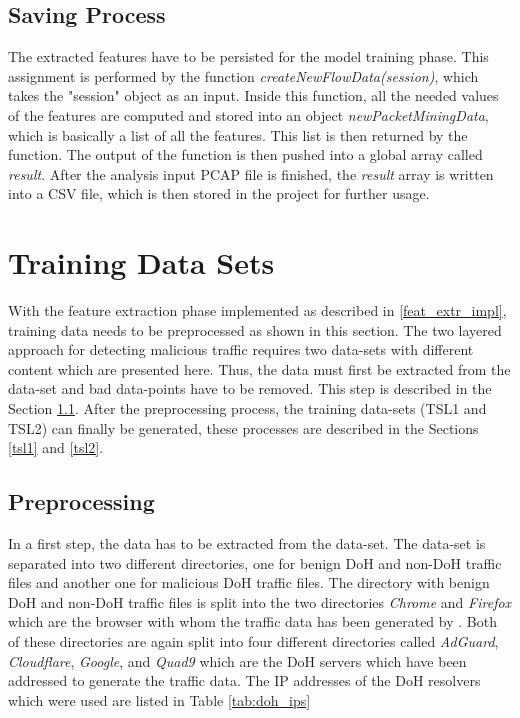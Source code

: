 \subsection{Saving Process}
The extracted features have to be persisted for the model training phase. This assignment is performed by the function \textit{createNewFlowData(session)}, which takes the "session" object as an input. Inside this function, all the needed values of the features are computed and stored into an object \textit{newPacketMiningData}, which is basically a list of all the features. This list is then returned by the function. The output of the function is then pushed into a global array called \textit{result}. After the analysis input PCAP file is finished, the \textit{result} array is written into a CSV file, which is then stored in the project for further usage.

\section{Training Data Sets} \label{training_ds}
With the feature extraction phase implemented as described in \ref{feat_extr_impl}, training data needs to be preprocessed as shown in this section. The two layered approach for detecting malicious traffic requires two data-sets with different content which are presented here. Thus, the data must first be extracted from the data-set \cite{CIRA-CIC-DoHBrw-2020} and bad data-points have to be removed. This step is described in the Section \ref{preprocessing}. After the preprocessing process, the training data-sets (TSL1 and TSL2) can finally be generated, these processes are described in the Sections \ref{tsl1} and \ref{tsl2}.

\subsection{Preprocessing} \label{preprocessing}
In a first step, the data has to be extracted from the data-set. The data-set is separated into two different directories, one for benign DoH and non-DoH traffic files and another one for malicious DoH traffic files. The directory with benign DoH and non-DoH traffic files is split into the two directories \textit{Chrome} and \textit{Firefox} which are the browser with whom the traffic data has been generated by \cite{montazerishatoori2020anomaly}. Both of these directories are again split into four different directories called \textit{AdGuard}, \textit{Cloudflare}, \textit{Google}, and \textit{Quad9} which are the DoH servers which have been addressed to generate the traffic data. The IP addresses of the DoH resolvers which were used are listed in Table \ref{tab:doh_ips}

